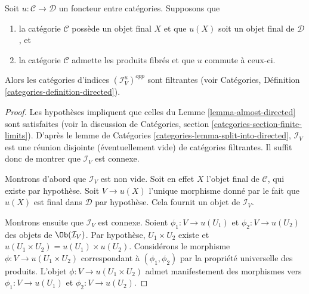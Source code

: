 \begin{lemma}
\label{lemma-directed}
Soit $u : \mathcal{C} \to \mathcal{D}$ un foncteur entre catégories.
Supposons que
\begin{enumerate}
\item la catégorie $\mathcal{C}$ possède un objet final $X$ et que
$u(X)$ soit un objet final de $\mathcal{D}$, et
\item la catégorie $\mathcal{C}$ admette les produits fibrés et que
$u$ commute à ceux-ci.
\end{enumerate}
Alors les catégories d’indices $(\mathcal{I}^u_V)^{opp}$ sont filtrantes (voir
Catégories, Définition \ref{categories-definition-directed}).
\end{lemma}

\begin{proof}
Les hypothèses impliquent que celles du
Lemme \ref{lemma-almost-directed}
sont satisfaites (voir la discussion de
Catégories, section \ref{categories-section-finite-limits}).
D’après le
lemme de Catégories \ref{categories-lemma-split-into-directed},
$\mathcal{I}_V$ est une réunion disjointe (éventuellement vide) de
catégories filtrantes.
Il suffit donc de montrer que $\mathcal{I}_V$ est connexe.

\medskip\noindent
Montrons d’abord que $\mathcal{I}_V$ est non vide.
Soit en effet $X$ l’objet final de $\mathcal{C}$,
qui existe par hypothèse.
Soit $V \to u(X)$ l’unique morphisme donné par le fait
que $u(X)$ est final dans $\mathcal{D}$ par hypothèse.
Cela fournit un objet de $\mathcal{I}_V$.

\medskip\noindent
Montrons ensuite que $\mathcal{I}_V$ est connexe.
Soient $\phi_1 : V \to u(U_1)$ et $\phi_2 : V \to u(U_2)$
des objets de $\Ob(\mathcal{I}_V)$. Par hypothèse, $U_1\times U_2$
existe et $u(U_1\times U_2) = u(U_1)\times u(U_2)$.
Considérons le morphisme $\phi : V \to u(U_1\times U_2)$
correspondant à $(\phi_1, \phi_2)$ par la propriété universelle
des produits. L’objet $\phi : V \to u(U_1\times U_2)$
admet manifestement des morphismes vers $\phi_1 : V \to u(U_1)$ et $\phi_2 : V \to u(U_2)$.
\end{proof}

